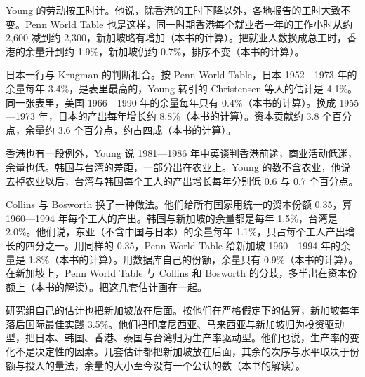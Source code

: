 
Young 的劳动按工时计。他说，除香港的工时下降以外，各地报告的工时大致不变\cite{young1994}。Penn World Table 也是这样，同一时期香港每个就业者一年的工作小时从约 2,600 减到约 2,300，新加坡略有增加（本书的计算）\cite{pwt1001}。把就业人数换成总工时，香港的余量升到约 1.9\%，新加坡仍约 0.7\%，排序不变（本书的计算）。

日本一行与 Krugman 的判断相合。按 Penn World Table，日本 1952—1973 年的余量每年 3.4\%，是表里最高的，Young 转引的 Christensen 等人的估计是 4.1\%\cite{young1994}。同一张表里，美国 1966—1990 年的余量每年只有 0.4\%（本书的计算）\cite{pwt1001}。换成 1955—1973 年，日本的产出每年增长约 8.8\%（本书的计算）\cite{pwt1001}。资本贡献约 3.8 个百分点，余量约 3.6 个百分点，约占四成（本书的计算）。

香港也有一段例外，Young 说 1981—1986 年中英谈判香港前途，商业活动低迷，余量也低\cite{young1994}。韩国与台湾的差距，一部分出在农业上。Young 的数不含农业，他说去掉农业以后，台湾与韩国每个工人的产出增长每年分别低 0.6 与 0.7 个百分点\cite{young1994}。

Collins 与 Bosworth 换了一种做法。他们给所有国家用统一的资本份额 0.35，算 1960—1994 年每个工人的产出\cite{collinsbosworth1996}。韩国与新加坡的余量都是每年 1.5\%，台湾是 2.0\%\cite{collinsbosworth1996}。他们说，东亚（不含中国与日本）的余量每年 1.1\%，只占每个工人产出增长的四分之一\cite{collinsbosworth1996}。用同样的 0.35，Penn World Table 给新加坡 1960—1994 年的余量是 1.8\%（本书的计算）\cite{pwt1001}。用数据库自己的份额，余量只有 0.9\%（本书的计算）。在新加坡上，Penn World Table 与 Collins 和 Bosworth 的分歧，多半出在资本份额上（本书的解读）。把这几套估计画在一起。

研究组自己的估计也把新加坡放在后面。按他们在严格假定下的估算，新加坡每年落后国际最佳实践 3.5\%\cite{worldbank1993}。他们把印度尼西亚、马来西亚与新加坡归为投资驱动型，把日本、韩国、香港、泰国与台湾归为生产率驱动型\cite{worldbank1993}。他们也说，生产率的变化不是决定性的因素\cite{worldbank1993}。几套估计都把新加坡放在后面，其余的次序与水平取决于份额与投入的量法，余量的大小至今没有一个公认的数（本书的解读）。

